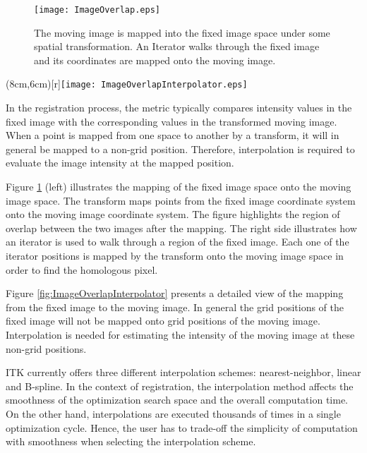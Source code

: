 % 
%

\begin{figure}
\center
\texttt{[image: ImageOverlap.eps]}
\caption[Mapping moving image to fixed image in Registration]{ The moving image
is mapped into the fixed image space under some spatial transformation. An
Iterator walks through the fixed image and its coordinates are mapped onto the
moving image.}
\label{fig:ImageOverlapIterator}
\end{figure}


\parpic(8cm,6cm)[r]{\texttt{[image: ImageOverlapInterpolator.eps]}}

In the registration process, the metric typically compares intensity values 
in the fixed image with the corresponding values in the transformed moving
image. When a point is mapped from one space to another by a transform,
it will in general be mapped to a non-grid position. Therefore, interpolation
is required to evaluate the image intensity at the mapped position.

Figure \ref{fig:ImageOverlapIterator} (left) illustrates the mapping of the
fixed image space onto the moving image space. The transform maps points from
the fixed image coordinate system onto the moving image coordinate system. The
figure highlights the region of overlap between the two images after the
mapping. The right side illustrates how an iterator is used to walk through a
region of the fixed image. Each one of the iterator positions is mapped by the
transform onto the moving image space in order to find the homologous pixel.

Figure \ref{fig:ImageOverlapInterpolator} presents a detailed view of the
mapping from the fixed image to the moving image. In general the grid positions
of the fixed image will not be mapped onto grid positions of the moving image.
Interpolation is needed for estimating the intensity of the moving image at
these non-grid positions.


ITK currently offers three different interpolation schemes: nearest-neighbor,
linear and B-spline. In the context of registration, the interpolation method
affects the smoothness of the optimization search space and the overall
computation time. On the other hand, interpolations are executed thousands of
times in a single optimization cycle. Hence, the user has to trade-off the
simplicity of computation with smoothness when selecting the interpolation 
scheme.


